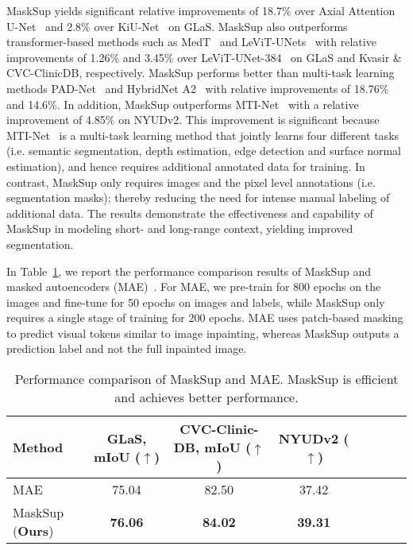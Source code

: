 \documentclass{bmvc2k}
\begin{document}
MaskSup yields significant relative improvements of 18.7\% over Axial Attention U-Net~\cite{wang2020axial} and 2.8\% over KiU-Net~\cite{valanarasu2021kiu} on GLaS. MaskSup also outperforms transformer-based methods such as MedT~\cite{valanarasu2021medical} and LeViT-UNets~\cite{xu2021levit} with relative improvements of 1.26\% and 3.45\% over LeViT-UNet-384~\cite{xu2021levit} on GLaS and Kvasir \& CVC-ClinicDB, respectively. MaskSup performs better than multi-task learning methods PAD-Net~\cite{xu2018pad} and HybridNet A2~\cite{lin2019depth} with relative improvements of 18.76\% and 14.6\%. In addition, MaskSup outperforms MTI-Net~\cite{vandenhende2020mti} with a relative improvement of 4.85\% on NYUDv2. This improvement is significant because MTI-Net~\cite{vandenhende2020mti} is a multi-task learning method that jointly learns four different tasks (i.e. semantic segmentation, depth estimation, edge detection and surface normal estimation), and hence requires additional annotated data for training. In contrast, MaskSup only requires images and the pixel level annotations (i.e. segmentation masks); thereby reducing the need for intense manual labeling of additional data. The results demonstrate the effectiveness and capability of MaskSup in modeling short- and long-range context, yielding improved segmentation.

In Table~\ref{Tab:mae}, we report the performance comparison results of MaskSup and masked autoencoders (MAE)~\cite{he2022masked}. For MAE, we pre-train for 800 epochs on the images and fine-tune for 50 epochs on images and labels, while MaskSup only requires a single stage of training for 200 epochs. MAE uses patch-based masking to predict visual tokens similar to image inpainting, whereas MaskSup outputs a prediction label and not the full inpainted image.
\begin{table}[!htb]
\caption{Performance comparison of MaskSup and MAE. MaskSup is efficient and achieves better performance.}
\medskip
\centering
\begin{tabular}{l*{7}{c}}
\toprule
\textbf{Method} & \textbf{GLaS, mIoU ($\uparrow$)} & \textbf{CVC-Clinic-DB, mIoU ($\uparrow$)} & \textbf{NYUDv2 ($\uparrow$)} \\
\midrule
MAE~\cite{he2022masked} & 75.04 & 82.50 & 37.42 \\
MaskSup (\textbf{Ours}) & \textbf{76.06} & \textbf{84.02} & \textbf{39.31} \\
\bottomrule
\end{tabular}
\label{Tab:mae}
\end{table}
\end{document}
